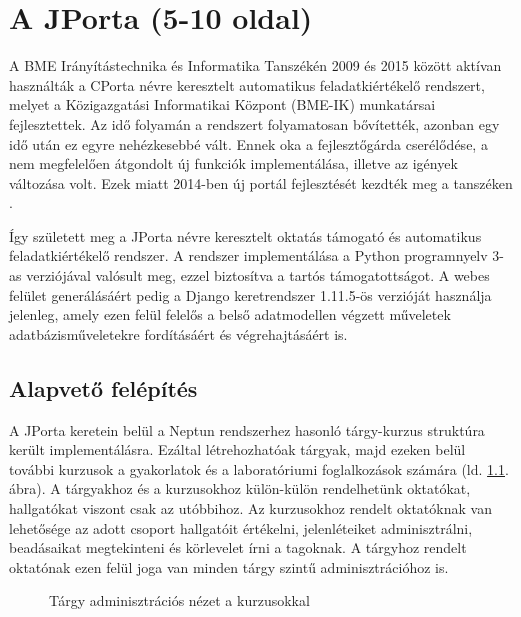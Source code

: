 \chapter{A JPorta (5-10 oldal)}\label{chapter:jporta}

A BME Irányítástechnika és Informatika Tanszékén 2009 és 2015 között aktívan használták a CPorta névre keresztelt automatikus feladatkiértékelő rendszert, melyet a Közigazgatási Informatikai Központ (BME-IK) munkatársai fejlesztettek. Az idő folyamán a rendszert folyamatosan bővítették, azonban egy idő után ez egyre nehézkesebbé vált. Ennek oka a fejlesztőgárda cserélődése, a nem megfelelően átgondolt új funkciók implementálása, illetve az igények változása volt. Ezek miatt 2014-ben új portál fejlesztését kezdték meg a tanszéken \cite{KalmanMsc}.

 Így született meg a JPorta névre keresztelt oktatás támogató és automatikus feladatkiértékelő rendszer. A rendszer implementálása a Python programnyelv 3-as verziójával valósult meg, ezzel biztosítva a tartós támogatottságot. A webes felület generálásáért pedig a Django \cite{Django} keretrendszer 1.11.5-ös verzióját használja jelenleg, amely ezen felül felelős a belső adatmodellen végzett műveletek adatbázisműveletekre fordításáért és végrehajtásáért is. 

 \section{Alapvető felépítés}

    A JPorta keretein belül a Neptun rendszerhez hasonló tárgy-kurzus struktúra került implementálásra. Ezáltal létrehozhatóak tárgyak, majd ezeken belül további kurzusok a gyakorlatok és a laboratóriumi foglalkozások számára (ld. \ref{fig:jporta_course}. ábra). A tárgyakhoz és a kurzusokhoz külön-külön rendelhetünk oktatókat, hallgatókat viszont csak az utóbbihoz. Az kurzusokhoz rendelt oktatóknak van lehetősége az adott csoport hallgatóit értékelni, jelenléteiket adminisztrálni, beadásaikat megtekinteni és körlevelet írni a tagoknak. A tárgyhoz rendelt oktatónak ezen felül joga van minden tárgy szintű adminisztrációhoz is.

     \begin{figure}[h]
        \centering
        \caption{Tárgy adminisztrációs nézet a kurzusokkal}
        \label{fig:jporta_course}
    \end{figure}    

